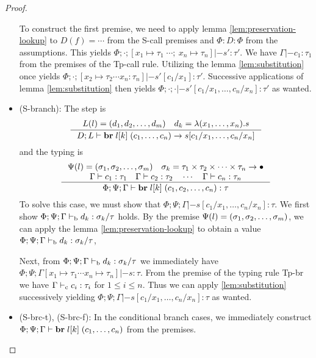 \documentclass[a4paper, oneside, 10pt, final]{memoir}
\begin{document}
\begin{proof}
\begin{itemize}
    To construct the first premise, we need to apply lemma
    \ref{lem:preservation-lookup} to $D(f) = \dotsb$ from the
    S-call premises and $\Phi : D : \Phi$ from the assumptions. This
    yields $\Phi;\cdot;[x_1 \mapsto \tau_1 \; \dotsb ;\ x_n \mapsto
    \tau_n] |- s' : \tau'$. We have $\Gamma |- c_1 : \tau_1$ from the
    premises of the Tp-call rule. Utilizing the lemma
    \ref{lem:substitution} once yields $\Phi;\cdot;[x_2 \mapsto \tau_2
    \dotsb x_n : \tau_n] |- s'[c_1/x_1] : \tau'$. Successive
    applications of lemma \ref{lem:substitution} then yields
    $\Phi;\cdot;\cdot |- s'[c_1/x_1,\dotsc,c_n/x_n] : \tau'$ as
    wanted.
  \item (S-branch):
    The step is
    \begin{equation*}
      \inference{L(l) = \dbundle \quad d_k = \lambda(x_1, \dotsc,
        x_n).s}
      {D;L |- \ibr{\lbl{k}}{(c_1, \dotsc, c_n)} -> s[c_1/x_1, \dotsc, c_n/x_n]}
    \end{equation*}
    and the typing is
    \begin{equation*}
      \inference{\Psi(l) = \bbtypes{} \quad \sigma_k =
        \ntypes -> \bullet\\
        \Gamma |- c_1 : \tau_1 \quad \Gamma |- c_2 : \tau_2 \quad \dotsb
        \quad \Gamma |- c_n : \tau_n}
      {\Phi;\Psi;\Gamma |- \ibr{\lbl{k}}(c_1, c_2, \dotsc, c_n) : \tau}
    \end{equation*}
    To solve this case, we must show that $\Phi;\Psi;\Gamma |-
    s[c_1/x_1,\dotsc,c_n/x_n] : \tau$. We first show $\Phi;\Psi;\Gamma
    |-_{\mathrm{b}} d_k : \sigma_k / \tau$ holds. By the premise $\Psi(l) =
    (\sigma_1, \sigma_2, \dotsc, \sigma_m)$, we can apply the lemma \ref{lem:preservation-lookup} to
    obtain a value $\Phi;\Psi;\Gamma |-_{\mathrm{b}} d_k : \sigma_k / \tau$,

    Next, from $\Phi;\Psi;\Gamma |-_{\mathrm{b}} d_k : \sigma_k / \tau$ we
    immediately have $\Phi;\Psi;\Gamma[x_1 \mapsto \tau_1 \dotsb x_n
    \mapsto \tau_n] |- s : \tau$. From the premise of the typing rule
    Tp-br we have $\Gamma |-_{\mathrm{c}} c_i : \tau_i$ for $1 \leq i \leq
    n$. Thus we can apply \ref{lem:substitution} successively yielding
    $\Phi;\Psi;\Gamma |- s[c_1/x_1,\dotsc,c_n/x_n] : \tau$ as wanted.
  \item (S-brc-t), (S-brc-f):
    In the conditional branch cases, we immediately construct
    $\Phi;\Psi;\Gamma |- \mathbf{br} \; l[k] \; (c_1, \dotsc, c_n)$ from the
    premises.
  \end{itemize}
\end{proof}
\end{document}
